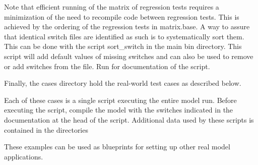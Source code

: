 \noindent 
Note that efficient running of the matrix of regression tests requires a
minimization of the need to recompile code between regression tests. This is
achieved by the ordering of the regression tests in {\file matrix.base}. A way
to assure that identical switch files are identified as such is to
systematically sort them. This can be done with the script {\file
sort\_switch} in the main {\file bin} directory. This script will add default
values of missing switches and can also be used to remove or add switches from
the file. Run  for documentation of the script.

\vspace{\baselineskip} \noindent 
Finally, the {\file cases} directory hold the real-world test cases as
described below.

\begin{flist}
\end{flist}

\noindent 
Each of these cases is a single script executing the entire model run. Before
executing the script, compile the model with the switches indicated in the
documentation at the head of the script. Additional data used by these scripts
is contained in the directories

\begin{flist}
\end{flist}

\noindent 
These examples can be used as blueprints for setting up other real model
applications.


